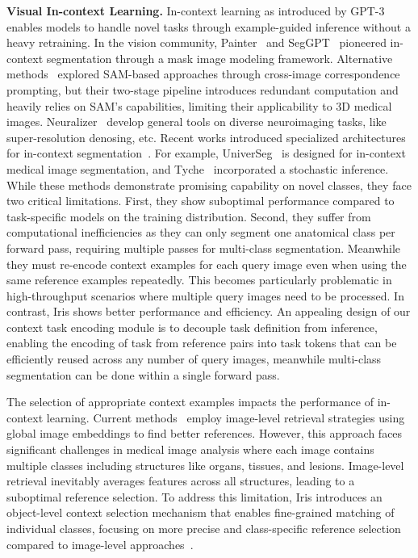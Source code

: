 \noindent\textbf{Visual In-context Learning.} 
In-context learning as introduced by GPT-3~\cite{brown2020language} enables models to handle novel tasks through example-guided inference without a heavy retraining. In the vision community, Painter~\cite{wang2023images} and SegGPT~\cite{wang2023seggpt} pioneered in-context segmentation through a mask image modeling framework. Alternative methods~\cite{liu2023matcher,zhang2023personalize,sun2024vrp} explored SAM-based approaches through cross-image correspondence prompting, but their two-stage pipeline introduces redundant computation and heavily relies on SAM's capabilities, limiting their applicability to 3D medical images. Neuralizer~\cite{czolbe2023neuralizer} develop general tools on diverse neuroimaging tasks, like super-resolution denosing, etc. Recent works introduced specialized architectures for in-context segmentation~\cite{meng2024segic}. For example, UniverSeg~\cite{butoi2023universeg} is designed for in-context medical image segmentation, and Tyche~\cite{rakic2024tyche} incorporated a stochastic inference. While these methods demonstrate promising capability on novel classes, they face two critical limitations. First, they show suboptimal performance compared to task-specific models on the training distribution. Second, they suffer from computational inefficiencies as they can only segment one anatomical class per forward pass, requiring multiple passes for multi-class segmentation. Meanwhile they must re-encode context examples for each query image even when using the same reference examples repeatedly. This becomes particularly problematic in high-throughput scenarios where multiple query images need to be processed. In contrast, Iris shows better performance and efficiency. An appealing design of our context task encoding module is to decouple task definition from inference, enabling the encoding of task from reference pairs into task tokens that can be efficiently reused across any number of query images, meanwhile multi-class segmentation can be done within a single forward pass. 


The selection of appropriate context examples impacts the performance of in-context learning. Current methods~\cite{zhang2023makes} employ image-level retrieval strategies using global image embeddings to find better references. However, this approach faces significant challenges in medical image analysis where each image contains multiple classes including structures like organs, tissues, and lesions. Image-level retrieval inevitably averages features across all structures, leading to a suboptimal reference selection. To address this limitation, Iris introduces an object-level context selection mechanism that enables fine-grained matching of individual classes, focusing on more precise and class-specific reference selection compared to image-level approaches~\cite{zhang2023makes}.
